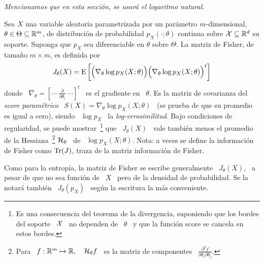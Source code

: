 {\it Mencionamos que en esta secci\'on, se usar\'a el logaritmo natural.}
%
\begin{definicion}
  Sea   $X$   una   variable   aleatoria  parametrizada   por   un   par\'ametro
  $m$-dimensional, $\theta  \in \Theta \subseteq \mathbb{R}^m$,  de distribuci\'on de
  probabilidad  $p_X(\cdot;\theta)$  continua sobre  $\mathcal{X}  \subseteq \mathbb{R}^d$  su
  soporte. Suponga que  $p_X$ sea diferenciable en $\theta$  sobre $\Theta$.  La
  matriz de Fisher, de tama\~no $m \times m$, es definida por
  \[
  J_\theta(X)  =  \operatorname{E}\left[  \Big(  \nabla_\theta \log  p_X(X;\theta)  \Big)
    \Big( \nabla_\theta \log p_X(X;\theta) \Big)^t \right]
  \]
  donde \  $\nabla_\theta = \left[ \cdots  \: \frac{\partial}{\partial \theta_i}
    \:  \cdots \right]^t$ \  es el  gradiente en  \ $\theta$.   Es la  matriz de
  covarianza  del  {\it  score  param\'etrico}  \  $S(X)  =  \nabla_\theta  \log
  p_X(X;\theta)$ \  (se prueba  de que su  promedio es  igual a cero),  siendo \
  $\log p_X$ \ la {\it  log-verosimilitud}.  Bajo condiciones de regularidad, se
  puede  mostrar~\footnote{Es una  consecuencia del  teorema de  la divergencia,
    suponiendo que los bordes del soporte \ $\mathcal{X}$ \ no dependen de \ $\theta$ \ y
    que la funci\'on  score se cancela en estos bordes.}   que \ $J_\theta(X)$ \
  vale tambi\'en menos  el promedio de la Hessiana~\footnote{Para  \ $f: \mathbb{R}^m
    \mapsto  \mathbb{R},  \quad \mathcal{H}_\theta  f$  \ es  la  matriz  de componentes  \
    $\frac{\partial^2 f}{\partial \theta_i \partial \theta_j}$.}  $\mathcal{H}_\theta$
  \ de  \ $\log  p_X(X;\theta)$.  Nota:  a veces se  define la  informaci\'on de
  Fisher como $\operatorname{Tr}(J)$, traza de la matriz informaci\'on de Fisher.
\end{definicion}
%
Como  para  la  entrop\'ia,  la  matriz  de Fisher  se  escribe  generalmente  \
$J_\theta(X)$, \ a pesar de que no sea  funci\'on de \ $X$ \ pero de la densidad
de  probabilidad.  Se  la  notar\'a  tambi\'en \  $J_\theta(p_X)$  \ seg\'un  la
escritura la m\'as conveniente.

